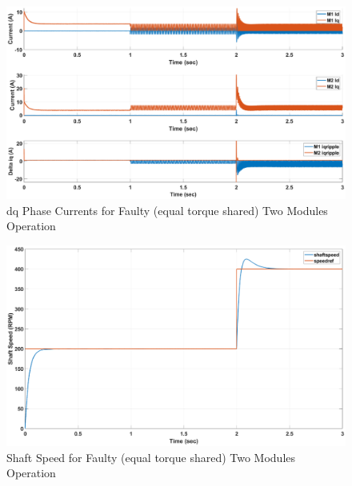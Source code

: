 \documentclass{article}
\begin{document}
\begin{figure}[H]
\centering
\includegraphics[scale=0.35]{SimulationResults/two_modules/faulty_torqueshared/Idq_iqripple.eps}
\caption{dq Phase Currents for Faulty (equal torque shared) Two Modules Operation}
\label{fig:PhaseCurrentsDqTwoModulesFaultyEqualTorque}
\end{figure}

\begin{figure}[H]
\centering
\includegraphics[scale=0.35]{SimulationResults/two_modules/faulty_torqueshared/speed.eps}
\caption{Shaft Speed for Faulty (equal torque shared) Two Modules Operation}
\label{fig:ShaftSpeedTwoModulesFaultyEqualTorque}
\end{figure}
\end{document}
